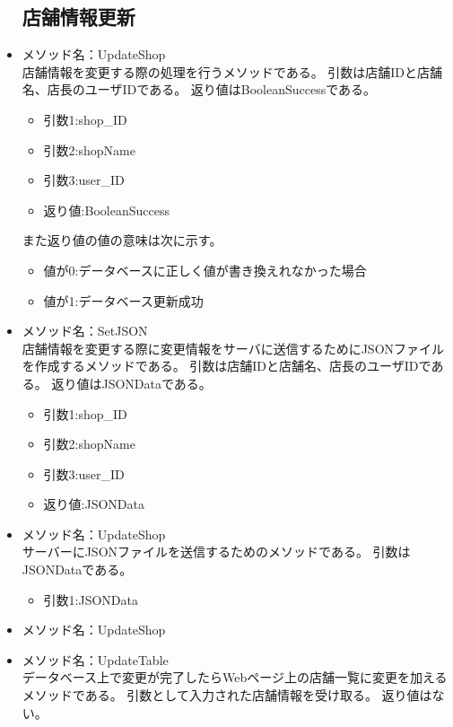 \documentclass[a4j]{jarticle}
\begin{document}
\begin{itemize}
\subsection{店舗情報更新}



\item メソッド名：UpdateShop\\

店舗情報を変更する際の処理を行うメソッドである。
引数は店舗IDと店舗名、店長のユーザIDである。
返り値はBooleanSuccessである。
	\begin{itemize}
		\item 引数1:shop\_ID
		\item 引数2:shopName
		\item 引数3:user\_ID
		\item 返り値:BooleanSuccess
	\end{itemize}
また返り値の値の意味は次に示す。
	\begin{itemize}
		\item 値が0:データベースに正しく値が書き換えれなかった場合
		\item 値が1:データベース更新成功
	\end{itemize}

\item メソッド名：SetJSON\\

店舗情報を変更する際に変更情報をサーバに送信するためにJSONファイルを作成するメソッドである。
引数は店舗IDと店舗名、店長のユーザIDである。
返り値はJSONDataである。
	\begin{itemize}
		\item 引数1:shop\_ID
		\item 引数2:shopName
		\item 引数3:user\_ID
		\item 返り値:JSONData
	\end{itemize}
\item メソッド名：UpdateShop\\

サーバーにJSONファイルを送信するためのメソッドである。
引数はJSONDataである。
	\begin{itemize}
		\item 引数1:JSONData
	\end{itemize}
\item メソッド名：UpdateShop\\
\item メソッド名：UpdateTable\\
データベース上で変更が完了したらWebページ上の店舗一覧に変更を加えるメソッドである。
引数として入力された店舗情報を受け取る。
返り値はない。


\end{itemize}
\end{document}
